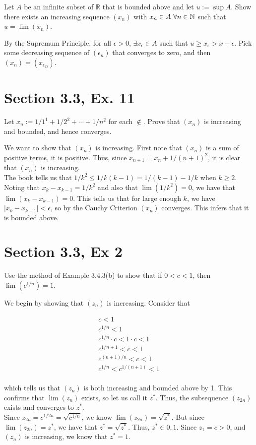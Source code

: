 \documentclass[paper=a4, fontsize=11pt]{scrartcl} %
\numberwithin{equation}{section} %
\numberwithin{figure}{section} %
\numberwithin{table}{section} %
\begin{document}
Let $A$ be an infinite subset of $\mathbb{R}$ that is bounded above and let $u := \sup A$. Show there exists an increasing sequence $(x_n)$ with $x_n \in A ~ \forall n \in \mathbb{N}$ such that $u = \lim(x_n)$.

\pf By the Supremum Principle, for all $\epsilon > 0$, $\exists x_\epsilon \in A$ such that $u \geq x_\epsilon > x - \epsilon$. Pick some decreasing sequence of $(\epsilon_n)$ that converges to zero, and then $(x_n) = ({x_\epsilon}_n)$. \done

\section*{Section 3.3, Ex. 11}

Let $x_n := 1/1^1 + 1/2^2 + \cdots + 1/n^2$ for each $\nin$. Prove that $(x_n)$ is increasing and bounded, and hence converges.

\pf We want to show that $(x_n)$ is increasing. First note that $(x_n)$ is a sum of positive terms, it is positive. Thus, since $x_{n+1} = x_n + 1/(n+1)^2$, it is clear that $(x_n)$ is increasing.\\

The book tells us that $1/k^2 \leq 1/k(k-1) = 1/(k-1) - 1/k$ when $k \geq 2$. Noting that $x_k - x_{k-1} = 1/k^2$ and also that $\lim(1/k^2) = 0$, we have that $\lim(x_k - x_{k-1}) = 0$. This tells us that for large enough $k$, we have $|x_k - x_{k-1}| < \epsilon$, so by the Cauchy Criterion $(x_n)$ converges. This infers that it is bounded above. \done

\section*{Section 3.3, Ex 2}

Use the method of Example 3.4.3(b) to show that if $0 < c < 1$, then $\lim(c^{1/n}) = 1$.

\pf We begin by showing that $(z_n)$ is increasing. Consider that

\begin{gather*}
c < 1\\
c^{1/n} < 1\\
c^{1/n} \cdot c < 1 \cdot c < 1\\
c^{1/n + 1} < c < 1\\
c^{(n + 1)/n} < c < 1\\
c^{1/n} < c^{1/(n+1)} < 1\\
\end{gather*}

which tells us that $(z_n)$ is both increasing and bounded above by 1. This confirms that $\lim(z_n)$ exists, so let us call it $z^*$. Thus, the subsequence $(z_{2n})$ exists and converges to $z^*$.\\

Since $z_{2n} = c^{1/2n} = \sqrt{c^{1/n}}$, we know $\lim(z_{2n}) = \sqrt{z^*}$. But since $\lim(z_{2n}) = z^*$,  we have that $z^* = \sqrt{z^*}$. Thus, $z^* \in {0,1}$. Since $z_1 = c > 0$, and $(z_n)$ is increasing, we know that $z^* = 1$. \done
\end{document}
